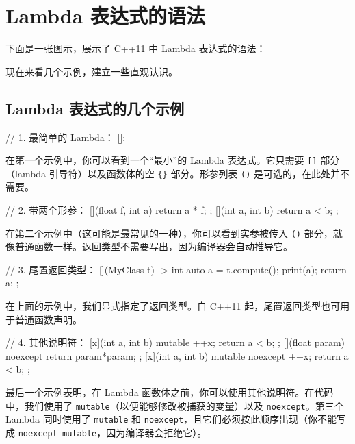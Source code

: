 \section{Lambda 表达式的语法}

下面是一张图示，展示了 C++11 中 Lambda 表达式的语法：


现在来看几个示例，建立一些直观认识。

\subsection{Lambda 表达式的几个示例}

\begin{codebox}
// 1. 最简单的 Lambda：
[]{};
\end{codebox}

在第一个示例中，你可以看到一个“最小”的 Lambda 表达式。它只需要 \texttt{[]} 部分（lambda 引导符）以及函数体的空 \texttt{\{\}} 部分。形参列表 \texttt{()} 是可选的，在此处并不需要。

\begin{codebox}
// 2. 带两个形参：
[](float f, int a) { return a * f; };
[](int a, int b) { return a < b; };
\end{codebox}

在第二个示例中（这可能是最常见的一种），你可以看到实参被传入 \texttt{()} 部分，就像普通函数一样。返回类型不需要写出，因为编译器会自动推导它。

\begin{codebox}
// 3. 尾置返回类型：
[](MyClass t) -> int { auto a = t.compute(); print(a); return a; };
\end{codebox}

在上面的示例中，我们显式指定了返回类型。自 C++11 起，尾置返回类型也可用于普通函数声明。

\begin{codebox}
// 4. 其他说明符：
[x](int a, int b) mutable { ++x; return a < b; };
[](float param) noexcept { return param*param; };
[x](int a, int b) mutable noexcept { ++x; return a < b; };
\end{codebox}

最后一个示例表明，在 Lambda 函数体之前，你可以使用其他说明符。在代码中，我们使用了 \texttt{mutable}（以便能够修改被捕获的变量）以及 \texttt{noexcept}。第三个 Lambda 同时使用了 \texttt{mutable} 和 \texttt{noexcept}，且它们必须按此顺序出现（你不能写成 \texttt{noexcept mutable}，因为编译器会拒绝它）。

